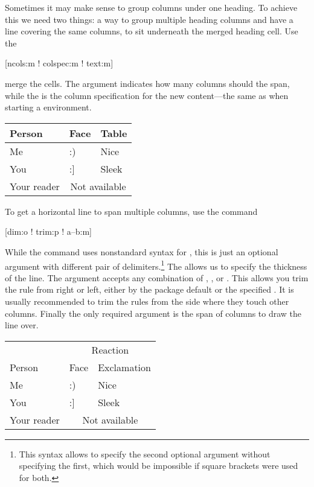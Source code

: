 Sometimes it may make sense to group columns under one heading. To achieve this
we need two things: a way to group multiple heading columns and have a line
covering the same columns, to sit underneath the merged heading cell. Use the
\begin{lscommand}
  [ncols:m ! colspec:m ! text:m]
\end{lscommand}
merge the cells. The  argument indicates how many columns should
the  span, while the  is the column specification for
the new content---the same as when starting a  environment.
\begin{chktexignore}
  \begin{example}[examplewidth=0.43\linewidth]
\begin{tabular}{@{}lll@{}}
  \toprule
  Person      & Face & Table       \\
  \midrule
  Me          & :)   & Nice        \\
  You         & :]   & Sleek       \\
  Your reader & \multicolumn{2}{c}{
                  Not available}   \\
  \bottomrule
\end{tabular}
\end{example}
\end{chktexignore}

To get a horizontal line to span multiple columns, use the command
\begin{lscommand}
  [dim:o ! trim:p ! a--b:m]
\end{lscommand}
While the command uses nonstandard syntax for , this is just an
optional argument with different pair of delimiters.\footnote{This syntax
  allows to specify the second optional argument without specifying the first,
  which would be impossible if square brackets were used for both.} The
 allows us to specify the thickness of the line. The 
argument accepts any combination of , ,
 or . This allows you trim the rule from right
or left, either by the package default or the specified . It is
usually recommended to trim the rules from the side where they touch other
columns. Finally the only required argument  is the span of columns
to draw the line over.
\begin{chktexignore}
  \begin{example}[examplewidth=0.43\linewidth]
\begin{tabular}{@{}lll@{}}
  \toprule
              & \multicolumn{2}{c}{
                  Reaction}        \\
  \cmidrule(l){2-3}
  Person      & Face & Exclamation \\
  \midrule
  Me          & :)   & Nice        \\
  You         & :]   & Sleek       \\
  Your reader & \multicolumn{2}{c}{
                  Not available}   \\
  \bottomrule
\end{tabular}
\end{example}
\end{chktexignore}

